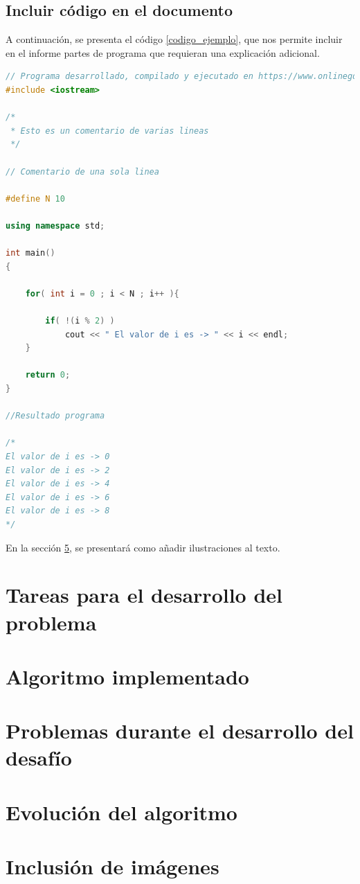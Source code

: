 \documentclass{article}
\begin{document}
\subsection{Incluir código en el documento}
%
A continuación, se presenta el código \ref{codigo_ejemplo}, que nos permite incluir en el informe partes de programa que requieran una explicación adicional.
\begin{lstlisting}[language=C++, label=codigo_ejemplo]
// Programa desarrollado, compilado y ejecutado en https://www.onlinegdb.com
#include <iostream>

/*
 * Esto es un comentario de varias lineas
 */

// Comentario de una sola linea

#define N 10

using namespace std;

int main()
{
    
    for( int i = 0 ; i < N ; i++ ){
        
        if( !(i % 2) )
            cout << " El valor de i es -> " << i << endl;
    }
    
    return 0;
}

//Resultado programa

/*
El valor de i es -> 0
El valor de i es -> 2
El valor de i es -> 4
El valor de i es -> 6
El valor de i es -> 8
*/
\end{lstlisting}
En la sección \ref{imagenes}, se presentará como añadir ilustraciones al texto.

\section{Tareas para el desarrollo del problema} \label{imagenes}
\section{Algoritmo implementado} \label{imagenes}
\section{Problemas durante el desarrollo del desafío} \label{imagenes}
\section{Evolución del algoritmo} \label{imagenes}

\section{Inclusión de imágenes} \label{imagenes}
\end{document}
